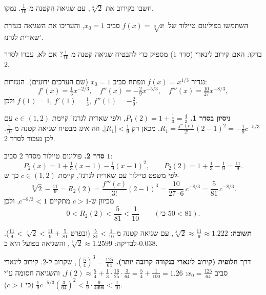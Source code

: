 
\begin{question}
חשבו בקירוב את $\sqrt[3]{2}$, עם שגיאה הקטנה מ-$\frac{1}{10}$. נמקו.
\end{question}

\begin{hint}
השתמשו בפולינום טיילור של $f(x) = \sqrt[3]{x}$ סביב $x_0 = 1$, והעריכו את השגיאה בעזרת שארית לגרנז'.
\end{hint}

\begin{hint}
בדקו: האם קירוב לינארי (סדר 1) מספיק כדי להבטיח שגיאה קטנה מ-$\frac1{10}$? אם לא, עברו לסדר 2.
\end{hint}

\begin{solution}
נגדיר $f(x) = x^{1/3}$ ונפתח סביב $x_0 = 1$ (שם הערכים ידועים). הנגזרות:
\[ f'(x) = \tfrac13 x^{-2/3},\quad f''(x) = -\tfrac29 x^{-5/3},\quad f'''(x) = \tfrac{10}{27}x^{-8/3}, \]
ולכן $f(1) = 1$, $f'(1) = \frac13$, $f''(1) = -\frac29$.

\textbf{ניסיון בסדר 1.} $P_1(2) = 1 + \frac13 = \frac43$, ולפי שארית לגרנז' קיימת $c\in(1,2)$ עם
$R_1 = \frac{f''(c)}{2!}(2-1)^2 = -\frac19 c^{-5/3}$. מכאן רק $|R_1| < \frac19$, וזה \emph{אינו} מבטיח שגיאה קטנה מ-$\frac1{10}$. לכן נעבור לסדר 2.

\textbf{סדר 2.} פולינום טיילור מסדר 2 סביב $1$:
\[ P_2(x) = 1 + \tfrac13(x-1) - \tfrac19(x-1)^2, \qquad P_2(2) = 1 + \tfrac13 - \tfrac19 = \tfrac{11}{9}. \]
לפי משפט טיילור עם שארית לגרנז', קיימת $c \in (1,2)$ כך ש-
\[ \sqrt[3]{2} - \tfrac{11}{9} = R_2(2) = \frac{f'''(c)}{3!}(2-1)^3 = \frac{10}{27\cdot 6}\,c^{-8/3} = \frac{5}{81}\,c^{-8/3}. \]
מכיוון ש-$c > 1$ מתקיים $c^{-8/3} < 1$, ולכן
\[ 0 < R_2(2) < \frac{5}{81} < \frac{1}{10} \qquad (\text{כי } 50 < 81). \]

\textbf{תשובה:} $\sqrt[3]{2} \approx \frac{11}{9} \approx 1.222$, עם שגיאה קטנה מ-$\frac{5}{81}<\frac1{10}$ (ובפרט $\frac{11}{9} < \sqrt[3]{2} < \frac{11}{9} + \frac{5}{81}$).
לבדיקה: $\sqrt[3]{2} \approx 1.2599$, והשגיאה בפועל היא כ-$0.038$.

\textbf{דרך חלופית (קירוב לינארי בנקודה קרובה יותר).} $\left(\frac54\right)^3 = \frac{125}{64}$, שקרוב ל-$2$. קירוב לינארי סביב $x_0 = \frac{125}{64}$:
$f(2) \approx \frac54 + \frac13\cdot\frac{16}{25}\cdot\frac{3}{64} = \frac54 + \frac1{100} = 1.26$, והשגיאה חסומה ע"י $\frac19 c^{-5/3}\left(\frac3{64}\right)^2 < \frac{1}{9}\cdot\frac{9}{4096}<\frac1{10}$ (כי $c>1$).
\end{solution}
